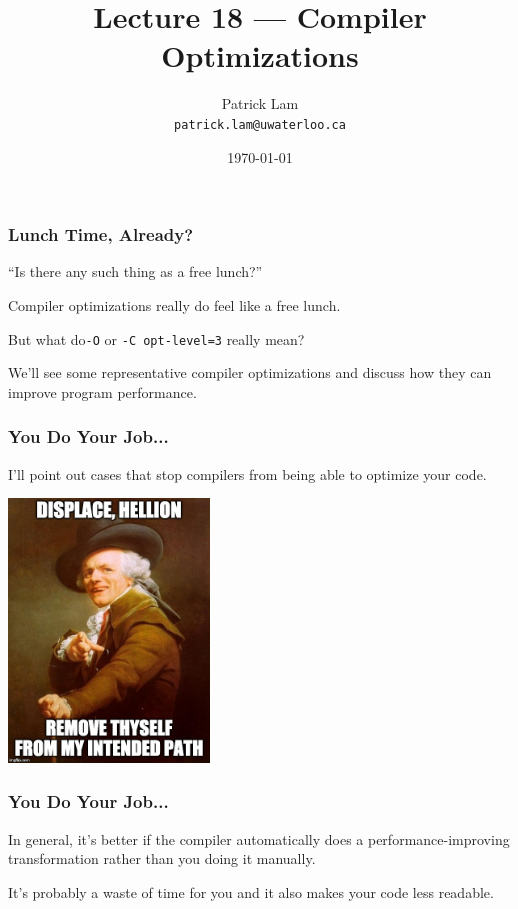 

\title{Lecture 18 --- Compiler Optimizations }

\author{Patrick Lam \\ \small \texttt{patrick.lam@uwaterloo.ca}}
\date{\today}




\begin{frame}
  \titlepage

\end{frame}

\begin{frame}
\frametitle{Lunch Time, Already?}

``Is there any such thing as a free lunch?''

Compiler optimizations really do feel like a free lunch.


But what do{\tt -O} or {\tt -C~opt-level=3} really mean?


We'll see some representative compiler optimizations and discuss how
they can improve program performance. 

\end{frame}

\begin{frame}
\frametitle{You Do Your Job...}

I'll point out cases that stop compilers
from being able to optimize your code. 

\begin{center}
	\includegraphics[width=0.4\textwidth]{images/ducreux.jpg}
\end{center}

\end{frame}

\begin{frame}
\frametitle{You Do Your Job...}

In general, it's better if the
compiler automatically does a performance-improving transformation
rather than you doing it manually.

It's probably a waste of time for
you and it also makes your code less readable.

\end{frame}



